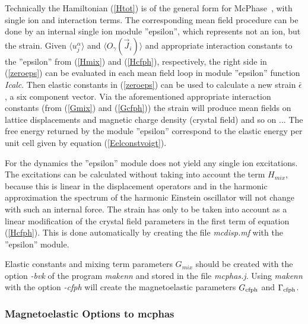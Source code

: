Technically the Hamiltonian (\ref{Htot}) is of the general form for 
McPhase~\cite{rotter12-213201}, with single
ion and interaction terms. The corresponding  mean field procedure can be done by an internal single ion module 
''epsilon'', which represents not an ion, but the
strain. Given $\langle u_{j}^{\alpha} \rangle$ and $\langle O_{\gamma}(\vec J_i) \rangle$ and
appropriate interaction constants to the ''epsilon'' from (\ref{Hmix}) and (\ref{Hcfph}), respectively,
the right side in (\ref{zeroeps}) can be evaluated in each mean field loop 
in module ''epsilon'' function {\em Icalc}. Then elastic constants in (\ref{zeroeps}) can be used to calculate
a new strain $\bar \epsilon$, a six component vector. Via the aforementioned appropriate
interaction constants (from (\ref{Gmix}) and (\ref{Gcfph})) the strain will produce mean
fields on lattice displacements and magnetic charge density (crystal field) and so on ...
The free energy returned by the module ''epsilon''  correspond to the elastic energy
per unit cell given by equation (\ref{Eelconstvoigt}). 

For the dynamics the ''epsilon'' module does not
yield any single ion excitations. The excitations can be calculated without taking into account the
term $H_{mix}$, because this is linear in the displacement operators and in the harmonic
approximation the spectrum of the harmonic Einstein oscillator will not change with such an
internal force. The strain has only to be taken into account as a linear modification of the crystal field
parameters in the first term of equation (\ref{Hcfph}). This is done automatically by creating the
file {\em mcdisp.mf} with the ''epsilon'' module.

Elastic constants and mixing term parameters $G_{mix}$ should be created with the
option {\em -bvk} of the program {\em makenn} and stored in the 
file {\em mcphas.j}. Using {\em makenn} with the option {\em -cfph} will create
the magnetoelastic parameters $G_{\rm cfph}$ and $\Gamma_{\rm cfph}$.

\subsubsection{Magnetoelastic Options to {\prg mcphas}}

